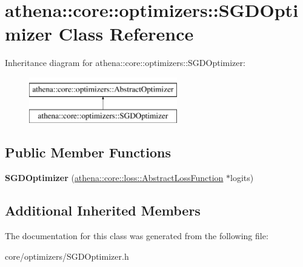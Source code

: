\hypertarget{classathena_1_1core_1_1optimizers_1_1_s_g_d_optimizer}{}\section{athena\+:\+:core\+:\+:optimizers\+:\+:S\+G\+D\+Optimizer Class Reference}
\label{classathena_1_1core_1_1optimizers_1_1_s_g_d_optimizer}
Inheritance diagram for athena\+:\+:core\+:\+:optimizers\+:\+:S\+G\+D\+Optimizer\+:\begin{figure}[H]
\begin{center}
\leavevmode
\includegraphics[height=2.000000cm]{classathena_1_1core_1_1optimizers_1_1_s_g_d_optimizer}
\end{center}
\end{figure}
\subsection*{Public Member Functions}
\begin{DoxyCompactItemize}
\item 
\mbox{\label{classathena_1_1core_1_1optimizers_1_1_s_g_d_optimizer_a7b49822dc95f2e603d1f96b9a3ea529c}} 
{\bfseries S\+G\+D\+Optimizer} (\mbox{\hyperlink{classathena_1_1core_1_1loss_1_1_abstract_loss_function}{athena\+::core\+::loss\+::\+Abstract\+Loss\+Function}} $\ast$logits)
\end{DoxyCompactItemize}
\subsection*{Additional Inherited Members}


The documentation for this class was generated from the following file\+:\begin{DoxyCompactItemize}
\item 
core/optimizers/S\+G\+D\+Optimizer.\+h\end{DoxyCompactItemize}
